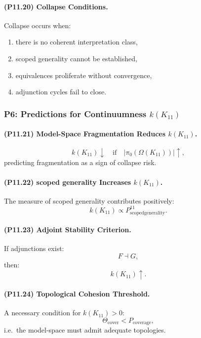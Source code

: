 \paragraph{(P11.20) Collapse Conditions.}
Collapse occurs when:
\begin{enumerate}
    \item there is no coherent interpretation class,
    \item scoped generality cannot be established,
    \item equivalences proliferate without convergence,
    \item adjunction cycles fail to close.
\end{enumerate}

\subsubsection{P6: Predictions for Continuumness $k(K_{11})$}

\paragraph{(P11.21) Model-Space Fragmentation Reduces $k(K_{11})$.}
\[
k(K_{11}) \downarrow \quad\text{if}\quad
|\pi_0(\Omega(K_{11}))| \uparrow,
\]
predicting fragmentation as a sign of collapse risk.

\paragraph{(P11.22) scoped generality Increases $k(K_{11})$.}
The measure of scoped generality contributes positively:
\[
k(K_{11}) \propto 
P_{\mathrm{scoped generality}}^{11}.
\]

\paragraph{(P11.23) Adjoint Stability Criterion.}
If adjunctions exist:
\[
F \dashv G,
\]
then:
\[
k(K_{11}) \uparrow.
\]

\paragraph{(P11.24) Topological Cohesion Threshold.}
A necessary condition for $k(K_{11}) > 0$:
\[
\Theta_{\mathrm{cover}} < P_{\mathrm{coverage}},
\]
i.e.\ the model-space must admit adequate topologies.

